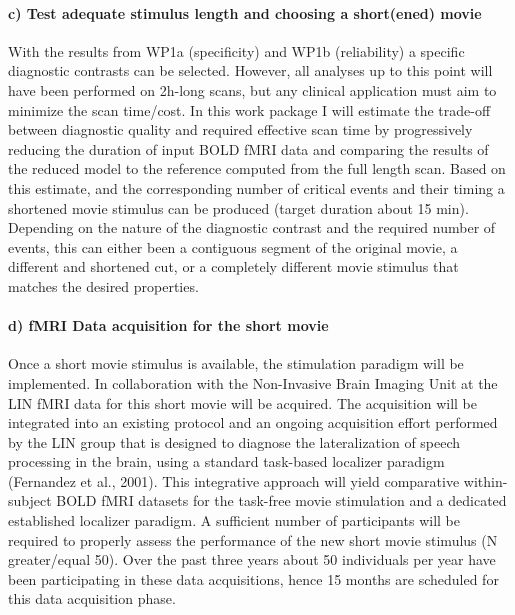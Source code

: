 \paragraph{c) Test adequate stimulus length and choosing a short(ened) movie}
%
With the results from WP1a (specificity) and WP1b (reliability) a specific
diagnostic contrasts can be selected.
%
However, all analyses up to this point will have been performed on 2h-long
scans, but any clinical application must aim to minimize the scan time/cost.
%
In this work package I will estimate the trade-off between diagnostic quality
and required effective scan time by progressively reducing the duration of input
BOLD fMRI data and comparing the results of the reduced model to the reference
computed from the full length scan.
%
Based on this estimate, and the corresponding number of critical events and
their timing a shortened movie stimulus can be produced (target duration about
15 min).
%
Depending on the nature of the diagnostic contrast and the required number
of events, this can either been a contiguous segment of the original movie, a
different and shortened cut, or a completely different movie stimulus that
matches the desired properties.

\paragraph{d) fMRI Data acquisition for the short movie}

%
Once a short movie stimulus is available, the stimulation paradigm will be
implemented.
%
In collaboration with the Non-Invasive Brain Imaging Unit at the LIN fMRI data
for this short movie will be acquired.
%
The acquisition will be integrated into an existing protocol and an ongoing
acquisition effort performed by the LIN group that is designed to diagnose the
lateralization of speech processing in the brain, using a standard task-based
localizer paradigm (Fernandez et al., 2001).
%
This integrative approach will yield comparative within-subject BOLD fMRI
datasets for the task-free movie stimulation and a dedicated established
localizer paradigm.
%
A sufficient number of participants will be required to properly assess the
performance of the new short movie stimulus (N greater/equal 50).
%
Over the past three years about 50 individuals per year have been participating
in these data acquisitions, hence 15 months are scheduled for this data
acquisition phase.

